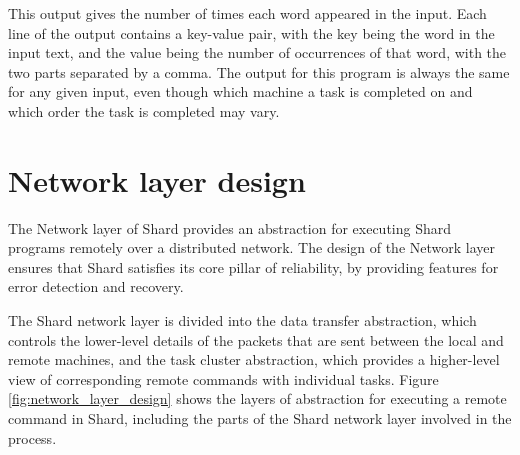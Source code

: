 \documentclass[oneside]{report}
\begin{document}
This output gives the number of times each word appeared in the input.
Each line of the output contains a key-value pair, with the key being the word in the input text, and the value being the number of occurrences of that word, with the two parts separated by a comma.
The output for this program is always the same for any given input, even though which machine a task is completed on and which order the task is completed may vary.

\section{Network layer design}


The Network layer of Shard provides an abstraction for executing Shard programs remotely over a distributed network.
The design of the Network layer ensures that Shard satisfies its core pillar of reliability, by providing features for error detection and recovery.

The Shard network layer is divided into the data transfer abstraction, which controls the lower-level details of the packets that are sent between the local and remote machines, and the task cluster abstraction, which provides a higher-level view of corresponding remote commands with individual tasks.
Figure \ref{fig:network_layer_design} shows the layers of abstraction for executing a remote command in Shard, including the parts of the Shard network layer involved in the process.
\end{document}
